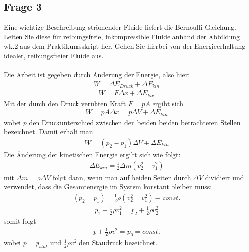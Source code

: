 \documentclass[a4paper,10pt]{scrartcl}
\begin{document}
		\subsection{Frage 3}
			Eine wichtige Beschreibung strömender Fluide liefert die Bernoulli-Gleichung. Leiten Sie diese
			für reibungsfreie, inkompressible Fluide anhand der Abbildung wk.2 aus dem Praktikumsskript her. Gehen Sie hierbei von der Energieerhaltung idealer, reibungsfreier Fluide aus.\\
			\\
			Die Arbeit ist gegeben durch Änderung der Energie, also hier:
			\begin{align*}
			W=\Delta E_{Druck}+\Delta E_{kin}
			\end{align*}
			\begin{align*}
			W=F\Delta x + \Delta E_{kin}
			\end{align*}
			Mit der durch den Druck verübten Kraft \(F=pA\) ergibt sich
			\begin{align*}
			W=pA\Delta x=p\Delta V +\Delta E_{kin}
			\end{align*}
			wobei \(p\) den Druckunterschied zwischen den beiden beiden betrachteten Stellen bezeichnet. Damit erhält man
			\begin{align*}
			W=(p_{2}-p_{1})\Delta V +\Delta E_{kin}
			\end{align*}
			Die Änderung der kinetischen Energie ergibt sich wie folgt:
			\begin{align*}
			\Delta E_{kin}=\frac{1}{2}\Delta m(v_{2}^{2}-v_{1}^{2})
			\end{align*}
			mit \(\Delta m=\rho \Delta V\) folgt dann, wenn man auf beiden Seiten durch \(\Delta V\) dividiert und verwendet, dass die Gesamtenergie im System konstant bleiben muss:
			\begin{align*}
			(p_{2}-p_{1})+\frac{1}{2}\rho (v_{2}^{2}-v_{1}^{2})=const.
			\end{align*}
			\begin{align*}
			p_{1}+\frac{1}{2}\rho v_{1}^{2}=p_{2}+\frac{1}{2}\rho v_{2}^{2}
			\end{align*}
			somit folgt
			\begin{align*}
			p+\frac{1}{2}\rho v^{2}=p_{0}=const.
			\end{align*}
			wobei \(p=p_{stat}\) und \(\frac{1}{2}\rho v^{2}\) den Staudruck bezeichnet.
			
\end{document}

